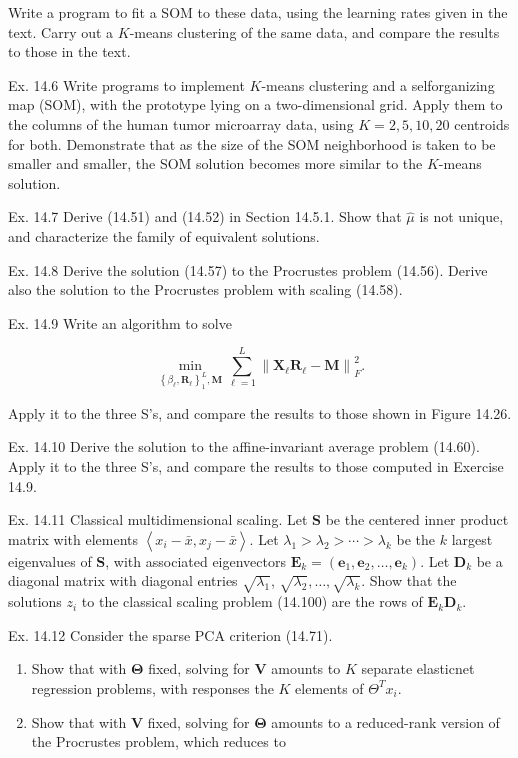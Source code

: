 \documentclass[10pt]{article}
\begin{document}
Write a program to fit a SOM to these data, using the learning rates given in the text. Carry out a $K$-means clustering of the same data, and compare the results to those in the text.

Ex. 14.6 Write programs to implement $K$-means clustering and a selforganizing map (SOM), with the prototype lying on a two-dimensional grid. Apply them to the columns of the human tumor microarray data, using $K=2,5,10,20$ centroids for both. Demonstrate that as the size of the SOM neighborhood is taken to be smaller and smaller, the SOM solution becomes more similar to the $K$-means solution.

Ex. 14.7 Derive (14.51) and (14.52) in Section 14.5.1. Show that $\hat{\mu}$ is not unique, and characterize the family of equivalent solutions.

Ex. 14.8 Derive the solution (14.57) to the Procrustes problem (14.56). Derive also the solution to the Procrustes problem with scaling (14.58).

Ex. 14.9 Write an algorithm to solve


\begin{equation*}
\min _{\left\{\beta_{\ell}, \mathbf{R}_{\ell}\right\}_{1}^{L}, \mathbf{M}} \sum_{\ell=1}^{L}\left\|\mathbf{X}_{\ell} \mathbf{R}_{\ell}-\mathbf{M}\right\|_{F}^{2} . \tag{14.115}
\end{equation*}


Apply it to the three S's, and compare the results to those shown in Figure 14.26.

Ex. 14.10 Derive the solution to the affine-invariant average problem (14.60). Apply it to the three S's, and compare the results to those computed in Exercise 14.9.

Ex. 14.11 Classical multidimensional scaling. Let $\mathbf{S}$ be the centered inner product matrix with elements $\left\langle x_{i}-\bar{x}, x_{j}-\bar{x}\right\rangle$. Let $\lambda_{1}>\lambda_{2}>\cdots> \lambda_{k}$ be the $k$ largest eigenvalues of $\mathbf{S}$, with associated eigenvectors $\mathbf{E}_{k}= \left(\mathbf{e}_{1}, \mathbf{e}_{2}, \ldots, \mathbf{e}_{k}\right)$. Let $\mathbf{D}_{k}$ be a diagonal matrix with diagonal entries $\sqrt{\lambda_{1}}$, $\sqrt{\lambda_{2}}, \ldots, \sqrt{\lambda_{k}}$. Show that the solutions $z_{i}$ to the classical scaling problem (14.100) are the rows of $\mathbf{E}_{k} \mathbf{D}_{k}$.

Ex. 14.12 Consider the sparse PCA criterion (14.71).

\begin{enumerate}
  \item Show that with $\boldsymbol{\Theta}$ fixed, solving for $\mathbf{V}$ amounts to $K$ separate elasticnet regression problems, with responses the $K$ elements of $\Theta^{T} x_{i}$.
  \item Show that with $\mathbf{V}$ fixed, solving for $\boldsymbol{\Theta}$ amounts to a reduced-rank version of the Procrustes problem, which reduces to
\end{enumerate}
\end{document}
